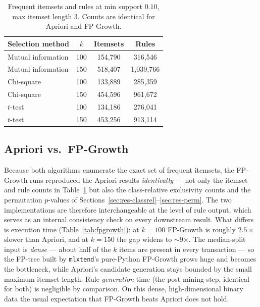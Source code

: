 \documentclass[twocolumn]{article}
\begin{document}
\begin{table}[h]
\centering
\small
\caption{Frequent itemsets and rules at min support $0.10$, max itemset
length 3. Counts are identical for Apriori and FP-Growth.}
\label{tab:apriori-scale}
\begin{tabular}{lccc}
\toprule
Selection method & $k$ & Itemsets & Rules \\
\midrule
Mutual information & 100 & 154{,}790 & 316{,}546 \\
Mutual information & 150 & 518{,}407 & 1{,}039{,}766 \\
Chi-square & 100 & 133{,}889 & 285{,}359 \\
Chi-square & 150 & 454{,}596 & 961{,}672 \\
$t$-test & 100 & 134{,}186 & 276{,}041 \\
$t$-test & 150 & 453{,}256 & 913{,}114 \\
\bottomrule
\end{tabular}
\end{table}

\subsection{Apriori vs.\ FP-Growth}
\label{sec:res-fpgrowth}

Because both algorithms enumerate the exact set of frequent itemsets, the
FP-Growth runs reproduced the Apriori results \emph{identically} --- not only
the itemset and rule counts in Table~\ref{tab:apriori-scale} but also the
class-relative exclusivity counts and the permutation $p$-values of
Sections~\ref{sec:res-classrel}--\ref{sec:res-perm}. The two implementations
are therefore interchangeable at the level of rule output, which serves as an
internal consistency check on every downstream result. What differs is
execution time (Table~\ref{tab:fpgrowth}): at $k=100$ FP-Growth is roughly
$2.5\times$ slower than Apriori, and at $k=150$ the gap widens to
$\sim$9$\times$. The median-split input is \emph{dense} --- about half of the
$k$ items are present in every transaction --- so the FP-tree built by
\texttt{mlxtend}'s pure-Python FP-Growth grows huge and becomes the bottleneck,
while Apriori's candidate generation stays bounded by the small maximum
itemset length. Rule \emph{generation} time (the post-mining step, identical
for both) is negligible by comparison. On this dense, high-dimensional binary
data the usual expectation that FP-Growth beats Apriori does not hold.
\end{document}
